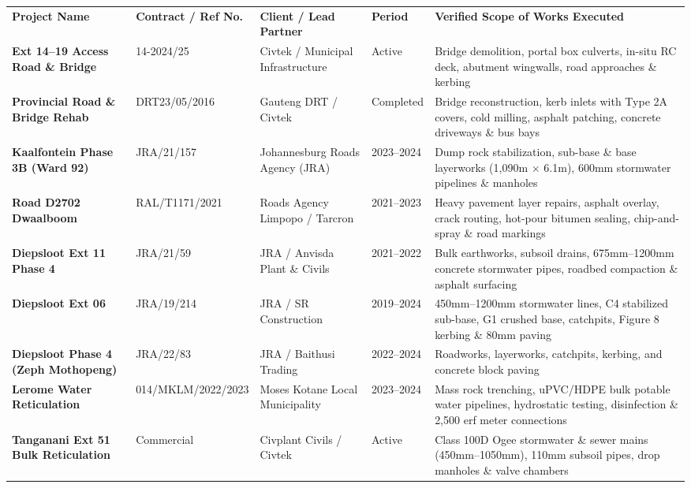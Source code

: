 \documentclass[a4paper,11pt]{article}
\begin{document}
{\fontsize{6.8pt}{8.4pt}\selectfont
\renewcommand{\arraystretch}{1.16}
\begin{tabularx}{\textwidth}{@{}p{3.2cm} p{2.2cm} p{2.6cm} p{1.3cm} X@{}}
\rowcolor{mhnavy}
{\color{white}\bfseries Project Name} & {\color{white}\bfseries Contract / Ref No.} & {\color{white}\bfseries Client / Lead Partner} & {\color{white}\bfseries Period} & {\color{white}\bfseries Verified Scope of Works Executed} \\
\rowcolor{mhbluelight}
\bfseries Ext 14--19 Access Road \& Bridge & 14-2024/25 & Civtek / Municipal Infrastructure & Active & Bridge demolition, portal box culverts, in-situ RC deck, abutment wingwalls, road approaches \& kerbing \\
\bfseries Provincial Road \& Bridge Rehab & DRT23/05/2016 & Gauteng DRT / Civtek & Completed & Bridge reconstruction, kerb inlets with Type 2A covers, cold milling, asphalt patching, concrete driveways \& bus bays \\
\rowcolor{mhbluelight}
\bfseries Kaalfontein Phase 3B (Ward 92) & JRA/21/157 & Johannesburg Roads Agency (JRA) & 2023--2024 & Dump rock stabilization, sub-base \& base layerworks (1,090m $\times$ 6.1m), 600mm stormwater pipelines \& manholes \\
\bfseries Road D2702 Dwaalboom & RAL/T1171/2021 & Roads Agency Limpopo / Tarcron & 2021--2023 & Heavy pavement layer repairs, asphalt overlay, crack routing, hot-pour bitumen sealing, chip-and-spray \& road markings \\
\rowcolor{mhbluelight}
\bfseries Diepsloot Ext 11 Phase 4 & JRA/21/59 & JRA / Anvisda Plant \& Civils & 2021--2022 & Bulk earthworks, subsoil drains, 675mm--1200mm concrete stormwater pipes, roadbed compaction \& asphalt surfacing \\
\bfseries Diepsloot Ext 06 & JRA/19/214 & JRA / SR Construction & 2019--2024 & 450mm--1200mm stormwater lines, C4 stabilized sub-base, G1 crushed base, catchpits, Figure 8 kerbing \& 80mm paving \\
\rowcolor{mhbluelight}
\bfseries Diepsloot Phase 4 (Zeph Mothopeng) & JRA/22/83 & JRA / Baithusi Trading & 2022--2024 & Roadworks, layerworks, catchpits, kerbing, and concrete block paving \\
\bfseries Lerome Water Reticulation & 014/MKLM/2022/2023 & Moses Kotane Local Municipality & 2023--2024 & Mass rock trenching, uPVC/HDPE bulk potable water pipelines, hydrostatic testing, disinfection \& 2,500 erf meter connections \\
\rowcolor{mhbluelight}
\bfseries Tanganani Ext 51 Bulk Reticulation & Commercial & Civplant Civils / Civtek & Active & Class 100D Ogee stormwater \& sewer mains (450mm--1050mm), 110mm subsoil pipes, drop manholes \& valve chambers \\

\end{tabularx}}
\end{document}
